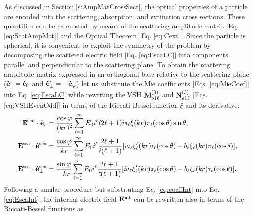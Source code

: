 As discussed in Section \ref{s:AmpMatCrossSect}, the optical properties of a particle are encoded into the scattering, absorption, and extinction cross sections. These quantities can be calculated by means of the scattering amplitude matrix [Eq. \eqref{eq:ScatAmpMat}] and the Optical Theorem [Eq. \eqref{eq:Cext}]. Since the particle is spherical, it is convenient to exploit the symmetry of the problem  by decomposing the scattered electric field [Eq. \eqref{eq:EscaLC}] into components parallel and perpendicular to the scattering plane. To obtain the scattering amplitude matrix  expressed in an orthogonal base relative to the scattering plane ($\vu{e}_\parallel^s =\vu{e}_\theta$ and $\vu{e}_\perp^s=-\vu{e}_\varphi$) let us substitute the Mie coefficients [Eqs. \eqref{eq:MieCoef}] into Eq. \eqref{eq:EscaLC}  while rewriting the VSH $\vb{M}^{(3)}_{o1\ell}$  and $\vb{N}^{(3)}_{e1\ell}$ [Eqs. \eqref{eq:VSHEvenOdd}] in terms of the Riccati-Bessel function  $\xi$ and its derivative:
%
\begin{subequations}\label{eq:Esca}%
\begin{align}
\vb{E}^\text{sca}\cdot\vu{e}_r &=  \frac{\cos\varphi}{(kr)^2}
								\sum_{\ell = 1}^\infty E_0i^\ell(2\ell+1)
								ia_\ell \xi(kr)\pi_\ell(\cos\theta) \sin\theta ,
\label{eq:EscaR}\\
\vb{E}^\text{sca}\cdot\vu{e}^\text{sca}_\parallel &=  \frac{\cos\varphi}{kr}
								\sum_{\ell = 1}^\infty E_0i^\ell\frac{2\ell+1}{\ell(\ell+1)}
						[i a_\ell\xi_\ell'(kr)\tau_\ell(\cos\theta)-b_\ell\xi_\ell(kr)\pi_\ell(\cos\theta)],
\label{eq:EscaTheta}\\
\vb{E}^\text{sca}\cdot\vu{e}^\text{sca}_\perp &=  \frac{\sin\varphi}{-kr}
								\sum_{\ell = 1}^\infty E_0i^\ell\frac{2\ell+1}{\ell(\ell+1)}
						[i a_\ell\xi_\ell'(kr)\pi_\ell(\cos\theta)-b_\ell\xi_\ell(kr)\tau_\ell(\cos\theta)].
\label{eq:EscaMPhi}
\end{align}%
\end{subequations}
%
Following a similar procedure but substituting Eq. \eqref{eq:coeffInt} into Eq. \eqref{eq:EscaInt}, the internal electric field $\vb{E}^\text{int}$ can be rewritten also in terms of the Riccati-Bessel functions as
%
